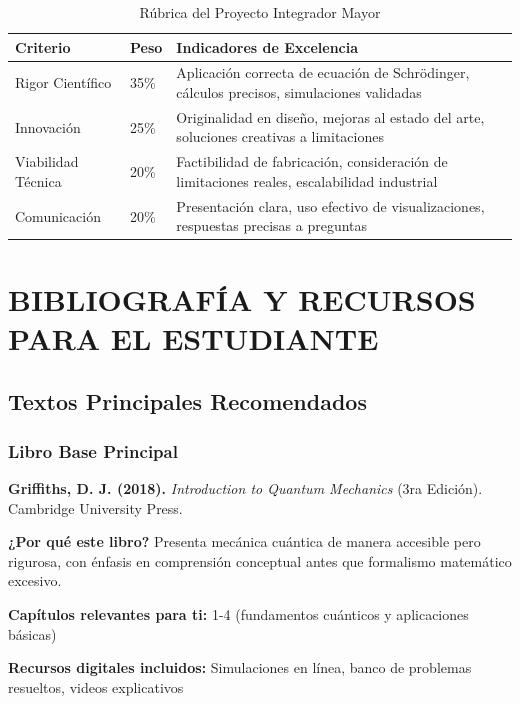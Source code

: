 \begin{tecnologiabox}
\begin{tecnologiabox}
\begin{tecnologiabox}
\begin{table}[h]
	\centering
	\caption{Rúbrica del Proyecto Integrador Mayor}
	\begin{tabular}{|L{3cm}|C{1.5cm}|L{7.5cm}|}
		\hline
		\textbf{Criterio} & \textbf{Peso} & \textbf{Indicadores de Excelencia} \\
		\hline
		Rigor Científico & 35\% & Aplicación correcta de ecuación de Schrödinger, cálculos precisos, simulaciones validadas \\
		\hline
		Innovación & 25\% & Originalidad en diseño, mejoras al estado del arte, soluciones creativas a limitaciones \\
		\hline
		Viabilidad Técnica & 20\% & Factibilidad de fabricación, consideración de limitaciones reales, escalabilidad industrial \\
		\hline
		Comunicación & 20\% & Presentación clara, uso efectivo de visualizaciones, respuestas precisas a preguntas \\
		\hline
	\end{tabular}
\end{table}

\chapter{BIBLIOGRAFÍA Y RECURSOS PARA EL ESTUDIANTE}

\section{Textos Principales Recomendados}

\subsection{Libro Base Principal}

\begin{tcolorbox}[colback=blue!5!white,colframe=blue!50!black,title=Texto Principal]
	\textbf{Griffiths, D. J. (2018).} \textit{Introduction to Quantum Mechanics} (3ra Edición). Cambridge University Press.
	
	\textbf{¿Por qué este libro?} Presenta mecánica cuántica de manera accesible pero rigurosa, con énfasis en comprensión conceptual antes que formalismo matemático excesivo.
	
	\textbf{Capítulos relevantes para ti:} 1-4 (fundamentos cuánticos y aplicaciones básicas)
	
	\textbf{Recursos digitales incluidos:} Simulaciones en línea, banco de problemas resueltos, videos explicativos
\end{tcolorbox}


\end{tecnologiabox}
\end{tecnologiabox}
\end{tecnologiabox}
